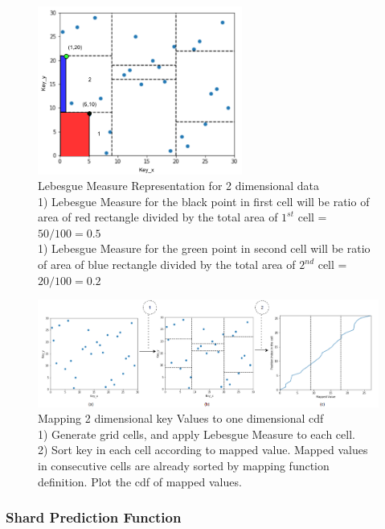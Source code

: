 \begin{figure}[t]
    \centering
    \includegraphics[width=0.6\textwidth]{graphs/implementation/Lebesgue_Measure.pdf}
    \caption{Lebesgue Measure Representation for 2 dimensional data\\
    1) Lebesgue Measure for the black point in first cell will be ratio of area of red rectangle divided by the total area of $1^{st}$ cell = $50/100=0.5$ \\
    1) Lebesgue Measure for the green point in second cell will be ratio of area of blue rectangle divided by the total area of $2^{nd}$ cell = $20/100= 0.2$}
    \label{fig:Lebesgue_Measure}
\end{figure}

\begin{figure}[t]
    \centering
    \includegraphics[width=1\textwidth]{graphs/Mapped_cdf.png}
    \caption{Mapping 2 dimensional key Values to one dimensional cdf\\
    1) Generate grid cells, and apply Lebesgue Measure to each cell.\\
    2) Sort key in each cell according to mapped value. Mapped values in consecutive cells are already sorted by mapping function definition. Plot the cdf of mapped values. }
    \label{fig:Mapped_Cdf}
\end{figure}

\subsubsection{Shard Prediction Function}

